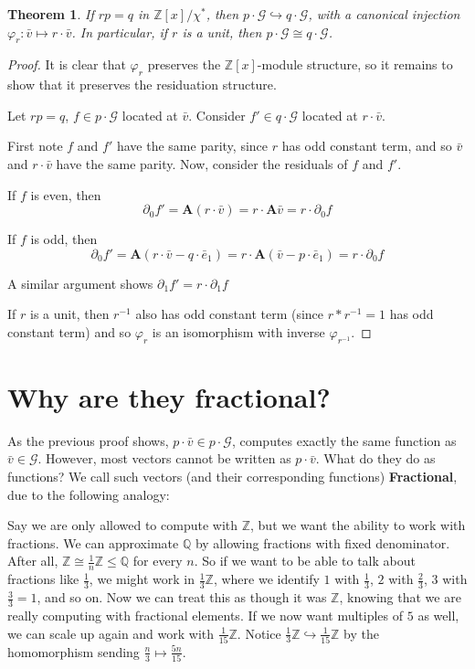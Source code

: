 \documentclass[runningheads]{llncs}
\newcommand{\G}{\mathcal{G}}
\newcommand{\Z}{\mathbb{Z}}
\newcommand{\Q}{\mathbb{Q}}
\newcommand{\2}{\textbf{2}}
\newcommand{\Am}{\textbf{A}}
\newcommand{\del}{\partial}
\newcommand{\vv}{\bar{v}}
\newcommand{\e}{\bar{e}}
\newtheorem{thm}{Theorem}
\begin{document}
\begin{thm}
  If $rp = q$ in $\Z[x] / \chi^*$, then 
  $p \cdot \G \hookrightarrow q \cdot \G$, 
  with a canonical injection $\varphi_r : \vv \mapsto r \cdot \vv$. 
  In particular, if $r$ is a unit, then $p \cdot \G \cong q \cdot \G$.
\end{thm}

\begin{proof}
  It is clear that $\varphi_r$ preserves the $\Z[x]$-module structure, so
  it remains to show that it preserves the residuation structure.

  Let $rp = q$, $f \in p \cdot \G$ located at $\vv$. 
  Consider $f' \in q \cdot \G$ located at $r \cdot \vv$.

  First note $f$ and $f'$ have the same parity, since 
  $r$ has odd constant term, and so $\vv$ and $r \cdot \vv$
  have the same parity. Now, consider the residuals of $f$ and $f'$. 
  
  If $f$ is even, then 
  \[ \del_0 f' = \Am (r \cdot \vv) = r \cdot \Am \vv = r \cdot \del_0 f \]

  If $f$ is odd, then
  \[ \del_0 f' = \Am (r \cdot \vv - q \cdot \e_1) 
               = r \cdot \Am (\vv - p \cdot \e_1)
               = r \cdot \del_0 f \]

  A similar argument shows $\del_1 f' = r \cdot \del_1 f$

  If $r$ is a unit, then $r^{-1}$ also has odd constant term 
  (since $r * r^{-1} = 1$ has odd constant term) and so $\varphi_r$
  is an isomorphism with inverse $\varphi_{r^{-1}}$.
\end{proof}

\section{Why are they fractional?}
As the previous proof shows, $p \cdot \vv \in p \cdot \G$, 
computes exactly the same function as $\vv \in \G$.
However, most vectors cannot be written as $p \cdot \vv$. 
What do they do as functions?
We call such vectors (and their corresponding functions)
\textbf{Fractional}, due to the following analogy:

Say we are only allowed to compute with $\Z$, but we want the ability
to work with fractions. We can approximate $\Q$ by allowing fractions
with fixed denominator. After all, $\Z \cong \frac{1}{n} \Z \leq \Q$
for every $n$. So if we want to be able to talk about fractions like 
$\frac{1}{3}$, we might work in $\frac{1}{3} \Z$, where we identify $1$
with $\frac{1}{3}$, $2$ with $\frac{2}{3}$, $3$ with $\frac{3}{3} = 1$, 
and so on. Now we can treat this as though it was $\Z$, knowing that we are
really computing with fractional elements. If we now want multiples of $5$ 
as well, we can scale up again and work with $\frac{1}{15} \Z$. Notice
$\frac{1}{3} \Z \hookrightarrow \frac{1}{15} \Z$ by the homomorphism sending
$\frac{n}{3} \mapsto \frac{5n}{15}$. 
\end{document}
